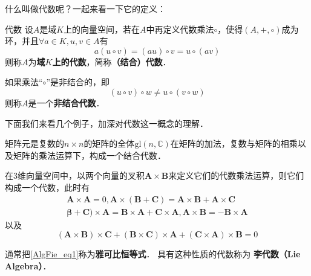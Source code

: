 

什么叫做代数呢？一起来看一下它的定义：
\begin{definition}{代数}
设$A$是域$K$上的向量空间，若在$A$中再定义代数乘法$\circ$，使得$(A,+,\circ)$成为环，并且$\forall a\in K, u, v\in A$有
\begin{equation}
a(u \circ v)=(a u) \circ v=u{\circ}(a v)
\end{equation}
则称$A$为\textbf{域$K$上的代数}，简称\textbf{（结合）代数}．

如果乘法“$\circ$”是非结合的，即
\begin{equation}
\left(u {\circ} v\right) \circ w \neq u{\circ}\left(v{\circ} w\right)
\end{equation}
则称$A$是一个\textbf{非结合代数}．
\end{definition}

下面我们来看几个例子，加深对代数这一概念的理解．

\begin{example}{}
矩阵元是复数的$n\times n$的矩阵的全体$\mathrm{gl}(n, \mathbb C)$在矩阵的加法，复数与矩阵的相乘以及矩阵的乘法运算下，构成一个结合代数．
\end{example}

\begin{example}{}
在$3$维向量空间中，以两个向量的叉积$\mathbf A\times \mathbf B$来定义它们的代数乘法运算，则它们构成一个代数，此时有
\begin{equation}
\begin{array}{l}\mathbf{A} \times \mathbf{A}=0, \mathbf{A} \times(\mathbf{B}+\mathbf{C})=\mathbf{A} \times \mathbf{B}+\mathbf{A} \times \mathbf{C} \\ \mathbf{\beta}+\mathbf{C}) \times \mathbf{A}=\mathbf{B} \times \mathbf{A}+\mathbf{C} \times \mathbf{A}, \mathbf{A} \times \mathbf{B}=-\mathbf{B} \times \mathbf{A}\end{array}
\end{equation}
以及
\begin{equation} \label{AlgFie_eq1}
(\mathbf{A} \times \mathbf{B}) \times \mathbf{C}+(\mathbf{B} \times \mathbf{C}) \times \mathbf{A}+(\mathbf{C} \times \mathbf{A}) \times \mathbf{B}=0
\end{equation}
\end{example}

通常把\autoref{AlgFie_eq1}称为\textbf{雅可比恒等式}． 具有这种性质的代数称为 \textbf{李代数（Lie Algebra）}．

